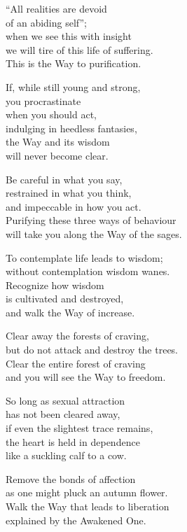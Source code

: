“All realities are devoid\\
of an abiding self”;\\
when we see this with insight\\
we will tire of this life of suffering.\\
This is the Way to purification.


If, while still young and strong,\\
you procrastinate\\
when you should act,\\
indulging in heedless fantasies,\\
the Way and its wisdom\\
will never become clear.


Be careful in what you say,\\
restrained in what you think,\\
and impeccable in how you act.\\
Purifying these three ways of behaviour\\
will take you along the Way of the sages.


To contemplate life leads to wisdom;\\
without contemplation wisdom wanes.\\
Recognize how wisdom\\
is cultivated and destroyed,\\
and walk the Way of increase.


Clear away the forests of craving,\\
but do not attack and destroy the trees.\\
Clear the entire forest of craving\\
and you will see the Way to freedom.


So long as sexual attraction\\
has not been cleared away,\\
if even the slightest trace remains,\\
the heart is held in dependence\\
like a suckling calf to a cow.


Remove the bonds of affection\\
as one might pluck an autumn flower.\\
Walk the Way that leads to liberation\\
explained by the Awakened One.


